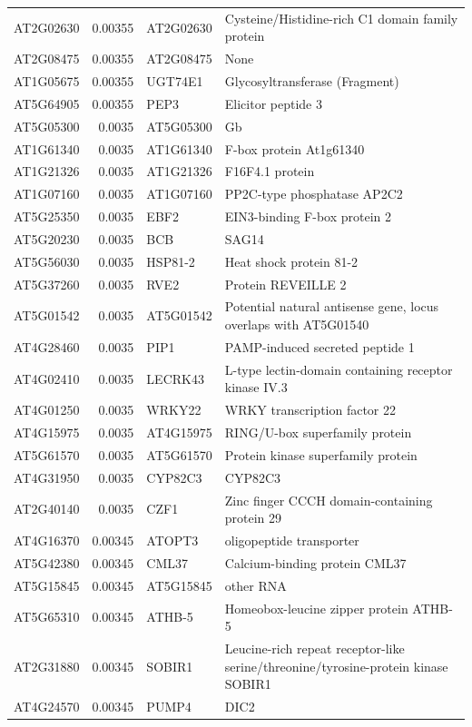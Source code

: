 \documentclass[11pt]{article}
\begin{document}
\begin{center}
\begin{tabular}{lrll}
AT2G02630 & 0.00355 & AT2G02630 & Cysteine/Histidine-rich C1 domain family protein\\
AT2G08475 & 0.00355 & AT2G08475 & None\\
AT1G05675 & 0.00355 & UGT74E1 & Glycosyltransferase (Fragment)\\
AT5G64905 & 0.00355 & PEP3 & Elicitor peptide 3\\
AT5G05300 & 0.0035 & AT5G05300 & Gb\\
AT1G61340 & 0.0035 & AT1G61340 & F-box protein At1g61340\\
AT1G21326 & 0.0035 & AT1G21326 & F16F4.1 protein\\
AT1G07160 & 0.0035 & AT1G07160 & PP2C-type phosphatase AP2C2\\
AT5G25350 & 0.0035 & EBF2 & EIN3-binding F-box protein 2\\
AT5G20230 & 0.0035 & BCB & SAG14\\
AT5G56030 & 0.0035 & HSP81-2 & Heat shock protein 81-2\\
AT5G37260 & 0.0035 & RVE2 & Protein REVEILLE 2\\
AT5G01542 & 0.0035 & AT5G01542 & Potential natural antisense gene, locus overlaps with AT5G01540\\
AT4G28460 & 0.0035 & PIP1 & PAMP-induced secreted peptide 1\\
AT4G02410 & 0.0035 & LECRK43 & L-type lectin-domain containing receptor kinase IV.3\\
AT4G01250 & 0.0035 & WRKY22 & WRKY transcription factor 22\\
AT4G15975 & 0.0035 & AT4G15975 & RING/U-box superfamily protein\\
AT5G61570 & 0.0035 & AT5G61570 & Protein kinase superfamily protein\\
AT4G31950 & 0.0035 & CYP82C3 & CYP82C3\\
AT2G40140 & 0.0035 & CZF1 & Zinc finger CCCH domain-containing protein 29\\
AT4G16370 & 0.00345 & ATOPT3 & oligopeptide transporter\\
AT5G42380 & 0.00345 & CML37 & Calcium-binding protein CML37\\
AT5G15845 & 0.00345 & AT5G15845 & other RNA\\
AT5G65310 & 0.00345 & ATHB-5 & Homeobox-leucine zipper protein ATHB-5\\
AT2G31880 & 0.00345 & SOBIR1 & Leucine-rich repeat receptor-like serine/threonine/tyrosine-protein kinase SOBIR1\\
AT4G24570 & 0.00345 & PUMP4 & DIC2\\

\end{tabular}
\end{center}
\end{document}

